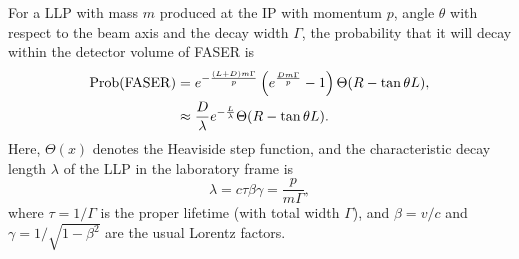 \documentclass[letterpaper,11pt]{article}
\begin{document}
\par For a LLP with mass $m$ produced at the IP with momentum $p$, angle $\theta$ with respect to the beam axis and the decay width $\Gamma$, the probability that it will decay within the detector volume of FASER is
\begin{equation}\label{eq:Faserprob}
\begin{split}
		{\rm Prob}({\rm FASER}) &= e^{-\frac{(L+D) m \Gamma}{p}} \left( e^{\frac{D m\Gamma}{p}} -1\right) \Theta(R-\tan{\theta}L), \\
		&\approx \frac{D}{\lambda} e^{-\frac{L}{\lambda}} \Theta(R-\tan{\theta}L). 
\end{split} 
\end{equation}
Here, $\Theta(x)$ denotes the Heaviside step function, and the characteristic decay length $\lambda$ of the LLP in the laboratory frame is
\begin{equation}
	\lambda = c \tau \beta \gamma  = \frac{p}{m\Gamma},
\end{equation}
where $\tau=1/\Gamma$ is the proper lifetime (with total width $\Gamma$), and $\beta=v/c$ and $\gamma=1/\sqrt{1-\beta^2}$ are the usual Lorentz factors.

\end{document}
